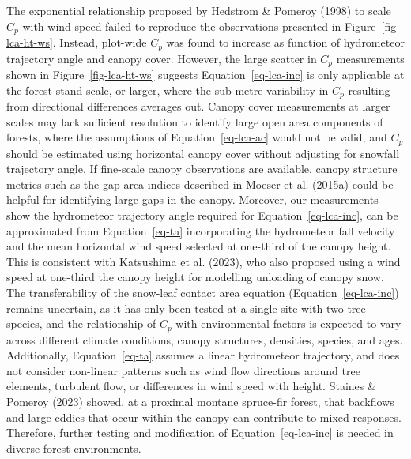 \documentclass[
  letterpaper,
  DIV=11,
  numbers=noendperiod]{scrartcl}
\begin{document}
The exponential relationship proposed by Hedstrom \& Pomeroy (1998) to
scale \(C_p\) with wind speed failed to reproduce the observations
presented in Figure~\ref{fig-lca-ht-ws}. Instead, plot-wide \(C_p\) was
found to increase as function of hydrometeor trajectory angle and canopy
cover. However, the large scatter in \(C_p\) measurements shown in
Figure~\ref{fig-lca-ht-ws} suggests Equation~\ref{eq-lca-inc} is only
applicable at the forest stand scale, or larger, where the sub-metre
variability in \(C_p\) resulting from directional differences averages
out. Canopy cover measurements at larger scales may lack sufficient
resolution to identify large open area components of forests, where the
assumptions of Equation~\ref{eq-lca-ac} would not be valid, and \(C_p\)
should be estimated using horizontal canopy cover without adjusting for
snowfall trajectory angle. If fine-scale canopy observations are
available, canopy structure metrics such as the gap area indices
described in Moeser et al. (2015a) could be helpful for identifying
large gaps in the canopy. Moreover, our measurements show the
hydrometeor trajectory angle required for Equation~\ref{eq-lca-inc}, can
be approximated from Equation~\ref{eq-ta} incorporating the hydrometeor
fall velocity and the mean horizontal wind speed selected at one-third
of the canopy height. This is consistent with Katsushima et al. (2023),
who also proposed using a wind speed at one-third the canopy height for
modelling unloading of canopy snow. The transferability of the snow-leaf
contact area equation (Equation~\ref{eq-lca-inc}) remains uncertain, as
it has only been tested at a single site with two tree species, and the
relationship of \(C_p\) with environmental factors is expected to vary
across different climate conditions, canopy structures, densities,
species, and ages. Additionally, Equation~\ref{eq-ta} assumes a linear
hydrometeor trajectory, and does not consider non-linear patterns such
as wind flow directions around tree elements, turbulent flow, or
differences in wind speed with height. Staines \& Pomeroy (2023) showed,
at a proximal montane spruce-fir forest, that backflows and large eddies
that occur within the canopy can contribute to mixed responses.
Therefore, further testing and modification of Equation~\ref{eq-lca-inc}
is needed in diverse forest environments.
\end{document}
